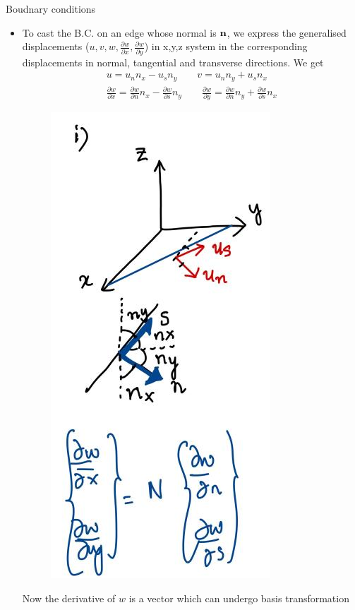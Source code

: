 	\begin{frame}{Boudnary conditions}
		\begin{itemize}
			\item To cast the B.C. on an edge whose normal is $\mathbf{n}$, we express the generalised displacements ($u,v,w,\frac{\partial w}{\partial x}, \frac{\partial w}{\partial y}$) in x,y,z system in the corresponding displacements in normal, tangential and transverse directions. We get
			\begin{equation}
			\begin{aligned}
				u = u_nn_x - u_sn_y \qquad v = u_nn_y + u_sn_x \\ 
				\frac{\partial w}{\partial x} = \frac{\partial w}{\partial n} n_x 
				- \frac{\partial w}{\partial s}n_y \qquad 
				\frac{\partial w}{\partial y} = \frac{\partial w}{\partial n}n_y
				+ \frac{\partial w}{\partial s}n_x
			\end{aligned}
			\end{equation}
			\begin{figure}
				\centering
				\includegraphics[width=0.2  \linewidth]{Figure/fig35} 		
			\end{figure}
		Now the derivative of $w$ is a vector which can undergo basis transformation
 		\end{itemize}
	\end{frame}


